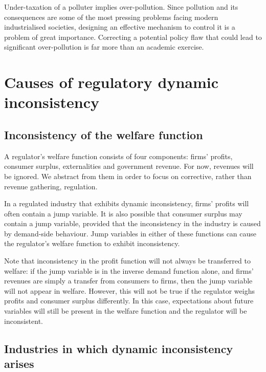 Under-taxation of a polluter implies over-pollution. Since pollution and its
consequences are some of the most pressing problems facing modern
industrialised societies, designing an effective mechanism to control it is
a problem of great importance. Correcting a potential policy flaw that could
lead to significant over-pollution is far more than an academic exercise.

\section{Causes of regulatory dynamic inconsistency}

\label{sec:caus-regul-dynam}

\subsection{Inconsistency of the welfare function}

\label{sec:incons-welf-funct}

A regulator's welfare function consists of four components: firms' profits,
consumer surplus, externalities and government revenue. For now, revenues
will be ignored. We abstract from them in order to focus on corrective,
rather than revenue gathering, regulation.

In a regulated industry that exhibits dynamic inconsistency, firms' profits
will often contain a jump variable. It is also possible that consumer
surplus may contain a jump variable, provided that the inconsistency in the
industry is caused by demand-side behaviour. Jump variables in either of
these functions can cause the regulator's welfare function to exhibit
inconsistency.

Note that inconsistency in the profit function will not always be
transferred to welfare: if the jump variable is in the inverse demand
function alone, and firms' revenues are simply a transfer from consumers to
firms, then the jump variable will not appear in welfare. However, this will
not be true if the regulator weighs profits and consumer surplus
differently. In this case, expectations about future variables will still be
present in the welfare function and the regulator will be inconsistent.

\subsection{Industries in which dynamic inconsistency arises}

\label{sec:industr-which-dynam}

